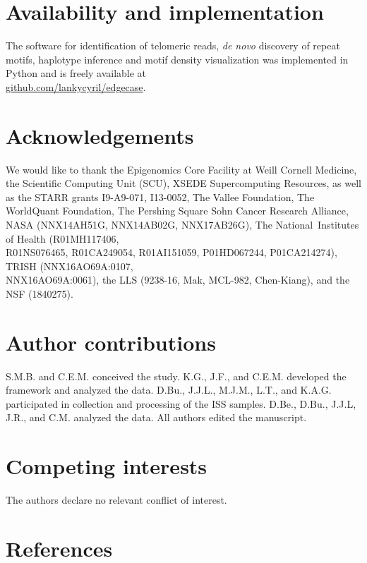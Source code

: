 \documentclass{article}
\begin{document}
\section*{Availability and implementation} 
The software for identification of telomeric reads, \textit{de novo} discovery of repeat motifs, haplotype inference and motif density visualization was implemented in Python and is freely available at \\ \href{https://github.com/lankycyril/edgecase}{github.com/lankycyril/edgecase}.

\section*{Acknowledgements} 
We would like to thank
the Epigenomics Core Facility at Weill Cornell Medicine,
the Scientific Computing Unit (SCU),
XSEDE Supercomputing Resources,
as well as
the STARR grants I9-A9-071, I13-0052,
The Vallee Foundation,
The WorldQuant Foundation,
The Pershing Square Sohn Cancer Research Alliance,
NASA (NNX14AH51G, NNX14AB02G, NNX17AB26G),
The National Institutes of Health (R01MH117406, \\ R01NS076465, R01CA249054, R01AI151059, P01HD067244, P01CA214274),
TRISH (NNX16AO69A:0107, \\ NNX16AO69A:0061),
the LLS (9238-16, Mak, MCL-982, Chen-Kiang),
and
the NSF (1840275).

\section*{Author contributions} 
S.M.B. and C.E.M. conceived the study.
K.G., J.F., and C.E.M. developed the framework and analyzed the data.
D.Bu., J.J.L., M.J.M., L.T., and K.A.G. participated in collection and processing of the ISS samples.
D.Be., D.Bu., J.J.L, J.R., and C.M. analyzed the data.
All authors edited the manuscript.

\section*{Competing interests} 
The authors declare no relevant conflict of interest.

\section*{References} 
\begingroup \raggedright \singlespacing \printbibliography[heading=none] \endgroup
\end{document}
